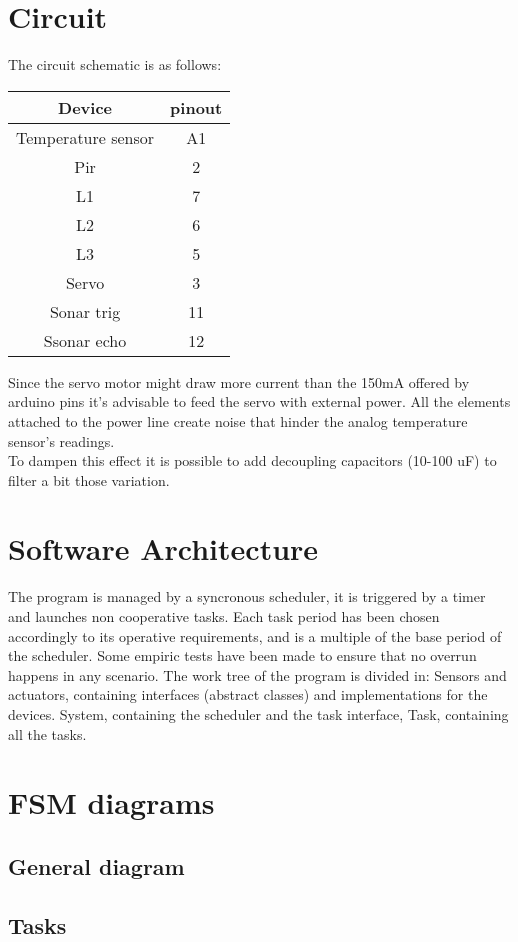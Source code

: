 \section{Circuit}
The circuit schematic is as follows:\\

\begin{center}
    \begin{tabular}{|c|c|}
        \hline
        Device             & pinout \\
        \hline
        \hline
        Temperature sensor & A1     \\
        \hline
        Pir                & 2      \\
        \hline
        L1                 & 7      \\
        \hline
        L2                 & 6      \\
        \hline
        L3                 & 5      \\
        \hline
        Servo              & 3      \\
        \hline
        Sonar trig         & 11     \\
        \hline
        Ssonar echo        & 12     \\
        \hline
    \end{tabular}
\end{center}
Since the servo motor might draw more current than the 150mA offered by arduino pins it's advisable to feed the servo with external power.
All the elements attached to the power line create noise that hinder the analog temperature sensor's readings.\\
To dampen this effect it is possible to add decoupling capacitors (10-100 uF) to filter a bit those variation.
\section{Software Architecture}
The program is managed by a syncronous scheduler, it is triggered by a timer and launches non cooperative tasks.
Each task period has been chosen accordingly to its operative requirements, and is a multiple of the base period of the scheduler.
Some empiric tests have been made to ensure that no overrun happens in any scenario.
The work tree of the program is divided in:
Sensors and actuators, containing interfaces (abstract classes) and implementations for the devices.
System, containing the scheduler and the task interface,
Task, containing all the tasks.
\section{FSM diagrams}
\subsection{General diagram}
\subsection{Tasks}
\lipsum[3]


